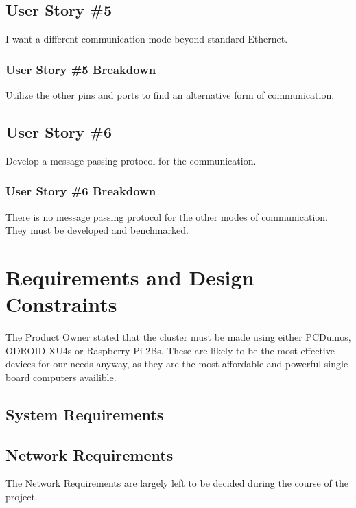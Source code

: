 \subsection{User Story \#5} 
I want a different communication mode beyond standard Ethernet.
\subsubsection{User Story \#5 Breakdown}
Utilize the other pins and ports to find an alternative form of communication.

\subsection{User Story \#6} 
Develop a message passing protocol for the communication.
\subsubsection{User Story \#6 Breakdown}
There is no message passing protocol for the other modes of communication. They must be developed and benchmarked.

\section{Requirements and Design Constraints}

The Product Owner stated that the cluster must be made using either PCDuinos, ODROID XU4s or Raspberry Pi 2Bs. These are likely to be  the most effective devices for our needs anyway, as they are the most affordable and powerful single board computers availible.

\subsection{System  Requirements}


\subsection{Network Requirements}
The Network Requirements are largely left to be decided during the course of the project. 


